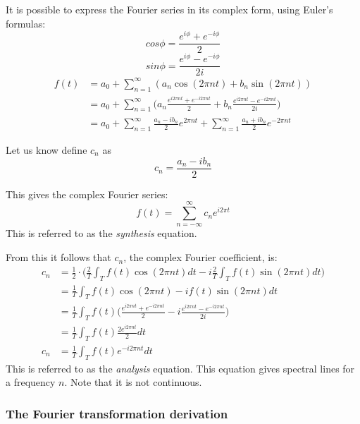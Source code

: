 \documentclass{article}
\begin{document}
It is possible to express the Fourier series in its complex form, using 
Euler's formulas:
$$cos \phi = \frac{e^{i\phi} + e^{-i\phi}}{2}$$
$$sin \phi = \frac{e^{i\phi} - e^{-i\phi}}{2i}$$
\begin{equation*}
	\begin{aligned}
		f(t) &=
		a_0 + \sum^{\infty}_{n=1}(a_n \cos(2 \pi n t) + b_n \sin(2 \pi n t)) \\
		& = a_0 + \sum^{\infty}_{n=1}\Big(
		a_n \frac{e^{i 2 \pi n t} + e^{-i 2 \pi n t}}{2} + 
		b_n \frac{e^{i 2 \pi n t} - e^{-i 2 \pi n t}}{2i}\Big) \\
		&= a_0 + \sum^{\infty}_{n=1} \frac{a_n - ib_n}{2}e^{2 \pi n t} +
		\sum^{\infty}_{n=1} \frac{a_n + ib_n}{2} e^{-2 \pi n t}
	\end{aligned}
\end{equation*}

Let us know define $c_n$ as 
$$c_n = \frac{a_n - i b_n}{2}$$

This gives the complex Fourier series:
\begin{equation*}
	f(t) = \sum^{\infty}_{n = - \infty} c_n e^{i 2 \pi t}
\end{equation*}
This is referred to as the \textit{synthesis} equation.

From this it follows that $c_n$, the complex Fourier coefficient, is:
\begin{equation*}
	\begin{aligned}
		c_n &= 
		\frac{1}{2} \cdot \bigg( \frac{2}{T} \int_T f(t) \cos(2 \pi n t) dt - 
		i \frac{2}{T} \int_T f(t) \sin(2 \pi n t) dt \bigg) \\
		&= \frac{1}{T} \int_T f(t) \cos(2 \pi n t) - i f(t) \sin(2 \pi n t) dt \\
		&= \frac{1}{T} \int_T f(t) \bigg( 
			\frac{e^{i 2 \pi n t} + e^{-i 2 \pi n t}}{2} - 
		i \frac{e^{i 2 \pi n t} - e^{-i 2 \pi n t}}{2i} \bigg) \\
		&= \frac{1}{T} \int_T f(t) \frac{2 e^{i 2 \pi n t}}{2} dt \\
		c_n &= \frac{1}{T} \int_T f(t) e^{-i 2 \pi n t} dt
	\end{aligned}
\end{equation*}
This is referred to as the \textit{analysis} equation. This equation gives 
spectral lines for a frequency $n$. Note that it is not continuous.

\subsubsection{The Fourier transformation derivation}
\end{document}
